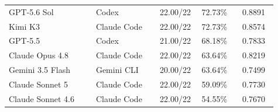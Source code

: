 \begin{longtable}{@{}M{0.30\linewidth}M{0.22\linewidth}N{0.12\linewidth}N{0.145\linewidth}N{0.125\linewidth}@{}}
GPT-5.6 Sol & Codex & 22.00/22 & 72.73\% & 0.8891 \\
Kimi K3 & Claude Code & 22.00/22 & 72.73\% & 0.8574 \\
GPT-5.5 & Codex & 21.00/22 & 68.18\% & 0.7833 \\
Claude Opus 4.8 & Claude Code & 22.00/22 & 63.64\% & 0.8219 \\
Gemini 3.5 Flash & Gemini CLI & 20.00/22 & 63.64\% & 0.7499 \\
Claude Sonnet 5 & Claude Code & 22.00/22 & 59.09\% & 0.7730 \\
Claude Sonnet 4.6 & Claude Code & 22.00/22 & 54.55\% & 0.7670 \\

\end{longtable}
\endgroup
